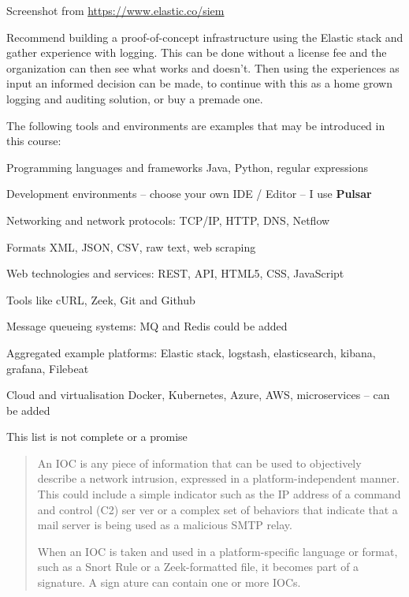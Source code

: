 \documentclass[Screen16to9,17pt]{foils}
\begin{document}
Screenshot from \url{https://www.elastic.co/siem}

Recommend building a proof-of-concept infrastructure using the Elastic stack and gather experience with logging. This can be done without a license fee and the organization can then see what works and doesn't. Then using the experiences as input an informed decision can be made, to continue with this as a home grown logging and auditing solution, or buy a premade one.



The following tools and environments are examples that may be introduced in this course:

\begin{list2}
\item Programming languages and frameworks Java, Python, regular expressions
\item Development environments -- choose your own IDE / Editor -- I use {\bf Pulsar}
\item Networking and network protocols: TCP/IP, HTTP, DNS, Netflow
\item Formats XML, JSON, CSV, raw text, web scraping
\item Web technologies and services: REST, API, HTML5, CSS, JavaScript
\item Tools like cURL, Zeek, Git and Github
\item Message queueing systems: MQ and Redis could be added
\item Aggregated example platforms: Elastic stack, logstash, elasticsearch, kibana, grafana, Filebeat
\item Cloud and virtualisation Docker, Kubernetes, Azure, AWS, microservices -- can be added
\end{list2}

\centerline{This list is not complete or a promise }



\begin{quote}
An IOC is any piece of information that can be used to objectively describe a
network intrusion, expressed in a platform-independent manner. This could include a simple indicator such as the IP address of a command and control (C2) ser
ver or a complex set of behaviors that indicate that a mail server is being used as a malicious SMTP relay.

When an IOC is taken and used in a platform-specific language or format, such as a Snort Rule or a Zeek-formatted file, it becomes part of a signature. A sign
ature can contain one or more IOCs.
\end{quote}
\end{document}
